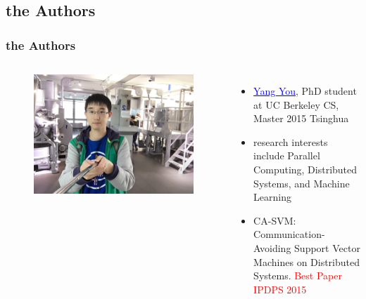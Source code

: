 \documentclass{beamer}
\begin{document}
\subsection{the Authors} 
\begin{frame}
	\frametitle{the Authors}
	\begin{columns}[c] %
		
		\begin{figure}
			\includegraphics[width=1\linewidth]{figs/yangyou2.jpg}
		\end{figure}
		
		\begin{itemize}
			\item \href{https://people.eecs.berkeley.edu/~youyang/}{\textcolor{blue}{Yang You}}, PhD student at UC Berkeley CS, Master 2015 Tsinghua
			\item research interests include Parallel Computing, Distributed Systems, and Machine Learning
			\item  CA-SVM: Communication-Avoiding Support Vector Machines on Distributed Systems.  \textcolor{red}{Best Paper IPDPS 2015}  
			
		\end{itemize}
		
	\end{columns}	
\end{frame}
\end{document}
